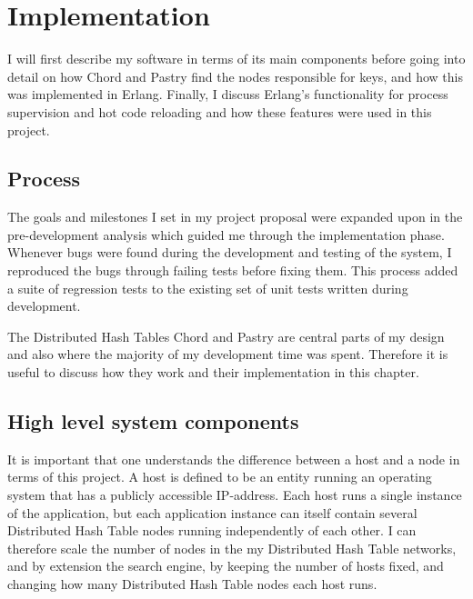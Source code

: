 

\chapter{Implementation}
I will first describe my software in terms of its main components before going into detail on how Chord and Pastry find the nodes responsible for keys, and how this was implemented in Erlang.
Finally, I discuss Erlang's functionality for process supervision and hot code reloading and how these features were used in this project.

\section{Process}
The goals and milestones I set in my project proposal were expanded upon in the pre-development analysis which guided me through the implementation phase.
Whenever bugs were found during the development and testing of the system, I reproduced the bugs through failing tests before fixing them. This process added a suite of regression tests to the existing set of unit tests written during development.

The Distributed Hash Tables Chord and Pastry are central parts of my design and also where the majority of my development time was spent. Therefore it is useful to discuss how they work and their implementation in this chapter.

\section{High level system components}
It is important that one understands the difference between a host and a node in terms of this project. A host is defined to be an entity running an operating system that has a publicly accessible IP-address. 
Each host runs a single instance of the application, but each application instance can itself contain several Distributed Hash Table nodes running independently of each other. I can therefore scale the number of nodes in the my Distributed Hash Table networks, and by extension the search engine, by keeping the number of hosts fixed, and changing how many Distributed Hash Table nodes each host runs.

